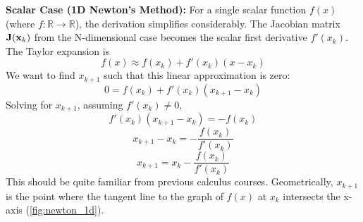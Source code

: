 \textbf{Scalar Case (1D Newton's Method):}
For a single scalar function $f(x)$ (where $f:\mathbb{R}\to\mathbb{R}$), the derivation simplifies considerably. The Jacobian matrix $\mathbf{J}(\mathbf x_k)$ from the N-dimensional case becomes the scalar first derivative $f'(x_k)$. The Taylor expansion is
\begin{equation}
    f(x) \approx f(x_k) + f'(x_k)(x - x_k)
\end{equation}
We want to find $x_{k+1}$ such that this linear approximation is zero:
\begin{equation}
    0 = f(x_k) + f'(x_k)(x_{k+1} - x_k)
\end{equation}
Solving for $x_{k+1}$, assuming $f'(x_k) \neq 0$,
\begin{equation}
    f'(x_k)(x_{k+1} - x_k) = -f(x_k)
\end{equation}
\begin{equation}
    x_{k+1} - x_k = -\frac{f(x_k)}{f'(x_k)}
\end{equation}
\begin{equation}
    x_{k+1} = x_k - \frac{f(x_k)}{f'(x_k)}
\end{equation}
This should be quite familiar from previous calculus courses. Geometrically, $x_{k+1}$ is the point where the tangent line to the graph of $f(x)$ at $x_k$ intersects the x-axis (\autoref{fig:newton_1d}).

